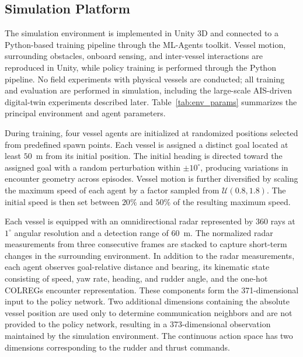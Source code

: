 \documentclass[final,5p,times,twocolumn]{elsarticle}
\begin{document}


\subsection{Simulation Platform} 
{\color{violet}

The simulation environment is implemented in Unity 3D and connected to
a Python-based training pipeline through the ML-Agents toolkit. Vessel
motion, surrounding obstacles, onboard sensing, and inter-vessel
interactions are reproduced in Unity, while policy training is performed
through the Python pipeline. No field experiments with physical vessels
are conducted; all training and evaluation are performed in simulation,
including the large-scale AIS-driven digital-twin experiments described
later. Table~\ref{tab:env_params} summarizes the principal environment
and agent parameters.

During training, four vessel agents are initialized at randomized
positions selected from predefined spawn points. Each vessel is assigned
a distinct goal located at least $50$~m from its initial position. The
initial heading is directed toward the assigned goal with a random
perturbation within $\pm10^\circ$, producing variations in encounter
geometry across episodes. Vessel motion is further diversified by
scaling the maximum speed of each agent by a factor sampled from
$\mathcal{U}(0.8,1.8)$. The initial speed is then set between $20\%$
and $50\%$ of the resulting maximum speed.

Each vessel is equipped with an omnidirectional radar represented by
$360$ rays at $1^\circ$ angular resolution and a detection range of
$60$~m. The normalized radar measurements from three consecutive frames
are stacked to capture short-term changes in the surrounding
environment. In addition to the radar measurements, each agent observes
goal-relative distance and bearing, its kinematic state consisting of
speed, yaw rate, heading, and rudder angle, and the one-hot COLREGs
encounter representation. These components form the 371-dimensional
input to the policy network. Two additional dimensions containing the
absolute vessel position are used only to determine communication
neighbors and are not provided to the policy network, resulting in a
373-dimensional observation maintained by the simulation environment.
The continuous action space has two dimensions corresponding to the
rudder and thrust commands.

}
\end{document}
